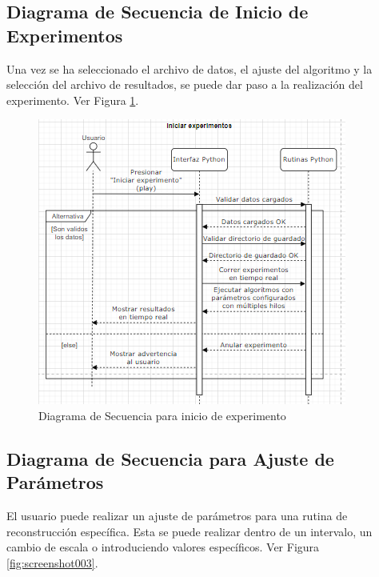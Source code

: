 \documentclass[12pt,twoside,letter]{ol-softwaremanual}
\begin{document}
\subsection{Diagrama de Secuencia de Inicio de Experimentos}

Una vez se ha seleccionado el archivo de datos, el ajuste del algoritmo y la selección del archivo de resultados, se puede dar paso a la realización del experimento. Ver Figura \ref{fig:screenshot006}.

\begin{figure}
	\centering
	\includegraphics[width=0.7\linewidth]{figures/screenshot006}
	\caption{Diagrama de Secuencia para inicio de experimento}
	\label{fig:screenshot006}
\end{figure}


\subsection{Diagrama de Secuencia para Ajuste de Parámetros}

El usuario puede realizar un ajuste de parámetros para una rutina de reconstrucción específica. Esta se puede realizar dentro de un intervalo, un cambio de escala o introduciendo valores específicos. Ver Figura \ref{fig:screenshot003}.
\end{document}
